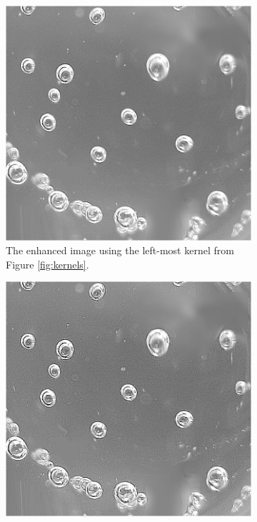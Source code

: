 \documentclass{article}
\begin{document}
\begin{figure}[H]
    \centering
    \caption{Results of testing \textsc{IPlaplacian}}
    \label{fig:IPlaplacianResults}
    \begin{subfigure}[t]{0.40\textwidth}
        \centering
        \includegraphics[width=\textwidth]{Assignment_1/output_images/laplacian_result_kernelA.png}
        \caption{The enhanced image using the left-most kernel from Figure \ref{fig:kernels}.}
        \label{fig:laplacianResultKernelA}
    \end{subfigure}
    \hfill
    \begin{subfigure}[t]{0.40\textwidth}
        \centering
        \includegraphics[width=\textwidth]{Assignment_1/output_images/laplacian_result_kernelB.png}

\end{subfigure}
\end{figure}
\end{document}
